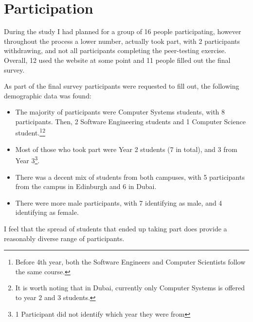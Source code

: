 \documentclass[a4paper,11pt]{report}
\begin{document}
\section{Participation}
During the study I had planned for a group of 16 people participating, however throughout the process a lower number, actually took part, with 2 participants withdrawing, and not all participants completing the peer-testing exercise. Overall, 12 used the website at some point and 11 people filled out the final survey.\par
As part of the final survey participants were requested to fill out, the following demographic data was found:
\begin{itemize}
\item The majority of participants were Computer Systems students, with 8 participants. Then, 2 Software Engineering students and 1 Computer Science student.\footnote{Before 4th year, both the Software Engineers and Computer Scientists follow the same course.}\footnote{It is worth noting that in Dubai, currently only Computer Systems is offered to year 2 and 3 students.}
\item Most of those who took part were Year 2 students (7 in total), and 3 from Year 3\footnote{1 Participant did not identify which year they were from}. 
\item There was a decent mix of students from both campuses, with 5 participants from the campus in Edinburgh and 6 in Dubai.
\item There were more male participants, with 7 identifying as male, and 4 identifying as female.
\end{itemize}
I feel that the spread of students that ended up taking part does provide a reasonably diverse range of participants.
\end{document}
